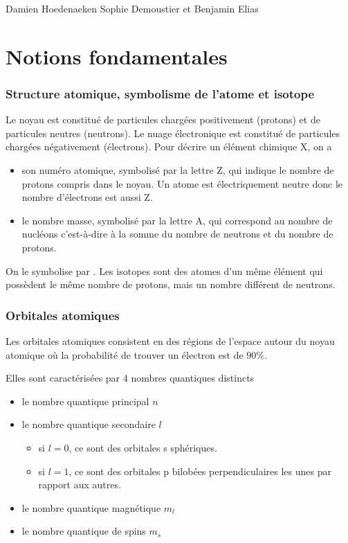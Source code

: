 
\usepackage{multirow}
\usepackage[version=3]{mhchem}
\usepackage{chemfig}
\usetikzlibrary{shapes,arrows}

\usepackage{layout}

{Damien Hoedenaeken}
{Sophie Demoustier et Benjamin Elias}

\part{Notions fondamentales}
\section{Structure atomique, symbolisme de l'atome et isotope}
Le noyau est constitué de particules chargées positivement (protons) et de particules neutres (neutrons).
Le nuage électronique est constitué de particules chargées négativement (électrons).
Pour décrire un élément chimique X, on a
\begin{itemize}
  \item son numéro atomique, symbolisé par la lettre Z, qui indique le nombre de protons compris dans le noyau.
    Un atome est électriquement neutre donc le nombre d'électrons est aussi Z.
  \item le nombre masse, symbolisé par la lettre A, qui correspond au nombre de nucléons
    c'est-à-dire à la somme du nombre de neutrons et du nombre de protons.
\end{itemize}
On le symbolise par .
Les isotopes sont des atomes d'un même élément qui possèdent le même nombre de protons, mais un nombre différent de neutrons.

\section{Orbitales atomiques}
Les orbitales atomiques consistent en des régions de l'espace autour du noyau atomique où la probabilité de trouver un électron est de $90\%$.

Elles sont caractérisées par 4 nombres quantiques distincts
\begin{itemize}
  \item le nombre quantique principal $n$
  \item le nombre quantique secondaire $l$
    \begin{itemize}
      \item si $l=0$, ce sont des orbitales s sphériques.
      \item si $l=1$, ce sont des orbitales p bilobées perpendiculaires les unes par rapport aux autres.
    \end{itemize}
  \item le nombre quantique magnétique $m_l$
  \item le nombre quantique de spins $m_s$
\end{itemize}

